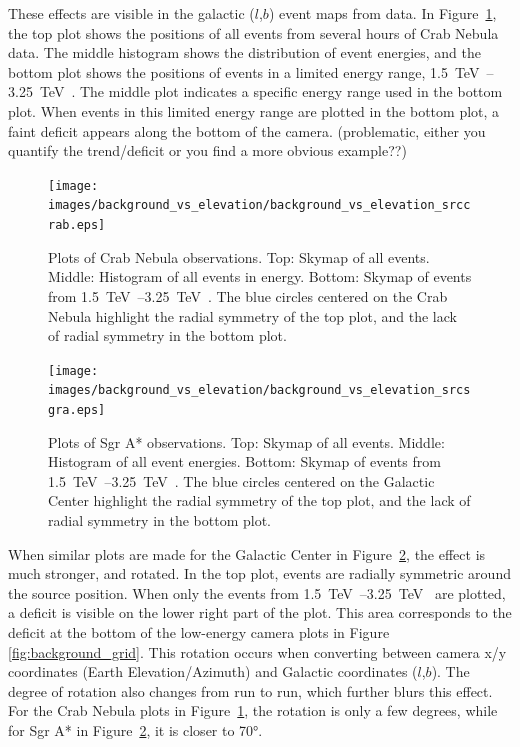     These effects are visible in the galactic ($l$,$b$) event maps from data.
    In Figure~\ref{fig:bkgvsel_crab}, the top plot shows the positions of all events from several hours of Crab Nebula data.
    The middle histogram shows the distribution of event energies, and the bottom plot shows the positions of events in a limited energy range, \SIrange{1.5}{3.25}{\TeV{}}.
    The middle plot indicates a specific energy range used in the bottom plot.
    When events in this limited energy range are plotted in the bottom plot, a faint deficit appears along the bottom of the camera.
    {\color{red}(problematic, either you quantify the trend/deficit or you find a more obvious example??)}
    
    \begin{figure}[p]
      \centering
      \texttt{[image: images/background\_vs\_elevation/background\_vs\_elevation\_srccrab.eps]}
      \caption[Background Vs Elevation Crab Nebula]
      {\small 
        Plots of Crab Nebula observations.
        Top: Skymap of all events.
        Middle: Histogram of all events in energy.
        Bottom: Skymap of events from \SIrange{1.5}{3.25}{\TeV{}}.  
        The blue circles centered on the Crab Nebula highlight the radial symmetry of the top plot, and the lack of radial symmetry in the bottom plot.
      }
      \label{fig:bkgvsel_crab}
    \end{figure}
    
    \begin{figure}[p]
      \centering
      \texttt{[image: images/background\_vs\_elevation/background\_vs\_elevation\_srcsgra.eps]}
      \caption[Background Vs Elevation Sgr A*]
      {\small 
        Plots of Sgr A* observations.
        Top: Skymap of all events.
        Middle: Histogram of all event energies.
        Bottom: Skymap of events from \SIrange{1.5}{3.25}{\TeV{}}.  
        The blue circles centered on the Galactic Center highlight the radial symmetry of the top plot, and the lack of radial symmetry in the bottom plot.
      }
      \label{fig:bkgvsel_sgra}
    \end{figure}
    
    When similar plots are made for the Galactic Center in Figure~\ref{fig:bkgvsel_sgra}, the effect is much stronger, and rotated.
    In the top plot, events are radially symmetric around the source position.
    When only the events from \SIrange{1.5}{3.25}{\TeV{}} are plotted, a deficit is visible on the lower right part of the plot.
    This area corresponds to the deficit at the bottom of the low-energy camera plots in Figure \ref{fig:background_grid}.
    This rotation occurs when converting between camera x/y coordinates (Earth Elevation/Azimuth) and Galactic coordinates ($l$,$b$).
    The degree of rotation also changes from run to run, which further blurs this effect.
    For the Crab Nebula plots in Figure~\ref{fig:bkgvsel_crab}, the rotation is only a few degrees, while for Sgr A* in Figure~\ref{fig:bkgvsel_sgra}, it is closer to \ang{70}.
    

